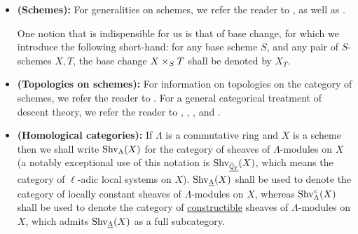         \begin{convention} \label{conv: algebraic_geometry}
            \noindent
            \begin{itemize}
                \item \textbf{(Schemes):} For generalities on schemes, we refer the reader to \cite[Chapters II and III]{hartshorne}, as well as \cite[\href{https://stacks.math.columbia.edu/tag/01H8}{Tag 01H8}, \href{https://stacks.math.columbia.edu/tag/01QL}{Tag 01QL}, and \href{https://stacks.math.columbia.edu/tag/0209}{Tag 0209}]{stacks}.
                
                One notion that is indispensible for us is that of base change, for which we introduce the following short-hand: for any base scheme $S$, and any pair of $S$-schemes $X, T$, the base change $X \x_S T$ shall be denoted by $X_T$.
                \item \textbf{(Topologies on schemes):} For information on topologies on the category of schemes, we refer the reader to \cite[\href{https://stacks.math.columbia.edu/tag/0214}{Tag 0214}]{stacks}. For a general categorical treatment of descent theory, we refer the reader to \cite{vistoli_descent}, \cite[section C2.1]{elephant1}, \cite[Chapter III]{sheaves_in_geometry_and_logic}, and \cite[\href{https://stacks.math.columbia.edu/tag/0266}{Tag 0266} and \href{https://stacks.math.columbia.edu/tag/0238}{Tag 0238}]{stacks}.
                \item \textbf{(Homological categories):} If $\Lambda$ is a commutative ring and $X$ is a scheme then we shall write $\mathrm{Shv}_{\Lambda}(X)$ for the category of sheaves of $\Lambda$-modules on $X$ (a notably exceptional use of this notation is $\mathrm{Shv}_{\underline{\bar{\mathbb{Q}}_{\ell}}}(X)$, which means the category of $\ell$-adic local systems on $X$). $\mathrm{Shv}_{\underline{\Lambda}}(X)$ shall be used to denote the category of locally constant sheaves of $\Lambda$-modules on $X$, whereas $\mathrm{Shv}_{\Lambda}^c(X)$ shall be used to denote the category of \href{https://stacks.math.columbia.edu/tag/05BE}{\underline{constructible}} sheaves of $\Lambda$-modules on $X$, which admits $\mathrm{Shv}_{\underline{\Lambda}}(X)$ as a full subcategory.
            \end{itemize}
        \end{convention}